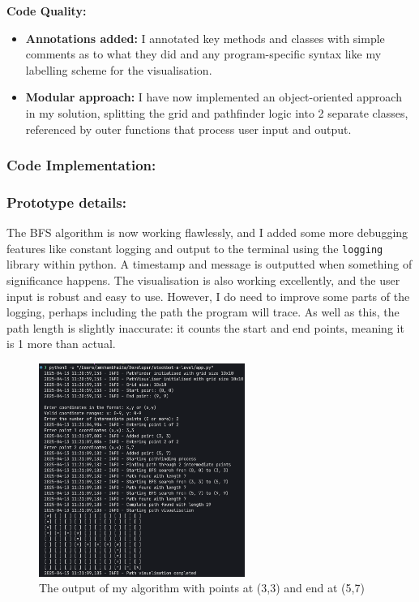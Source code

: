 \textbf{Code Quality:}
\begin{itemize}
    \item \textbf{Annotations added:} I annotated key methods and classes with simple comments as to what they did and any program-specific syntax like my labelling scheme for the visualisation.

    \item \textbf{Modular approach:} I have now implemented an object-oriented approach in my solution, splitting the grid and pathfinder logic into 2 separate classes, referenced by outer functions that process user input and output.
\end{itemize}

\newpage

\subsubsection{Code Implementation:}



\subsubsection{Prototype details:} 
The BFS algorithm is now working flawlessly, and I added some more debugging features like constant logging and output to the terminal using the \verb|logging| library within python. A timestamp and message is outputted when something of significance happens. The visualisation is also working excellently, and the user input is robust and easy to use. However, I do need to improve some parts of the logging, perhaps including the path the program will trace. As well as this, the path length is slightly inaccurate: it counts the start and end points, meaning it is 1 more than actual.

\begin{figure}[htbp]
    \centering
    \includegraphics[width=0.6\textwidth]{Images/sa2test1.png}
    \caption{The output of my algorithm with points at (3,3) and end at (5,7)}
\end{figure}

